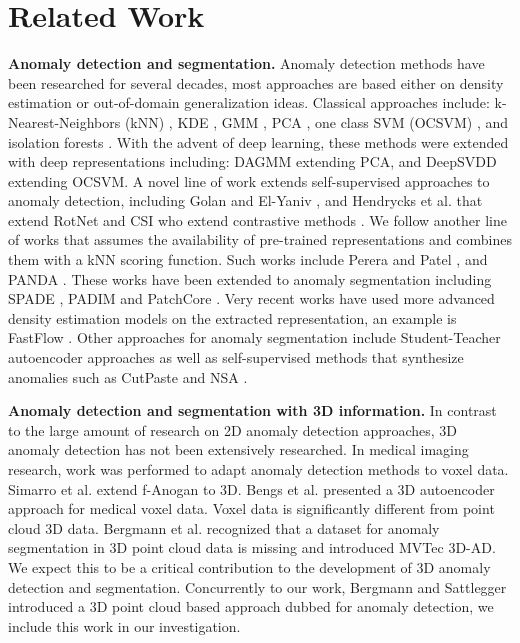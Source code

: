 \documentclass{article}
\begin{document}
\section{Related Work}
\textbf{Anomaly detection and segmentation.} Anomaly detection methods have been researched for several decades, most approaches are based either on density estimation or out-of-domain generalization ideas. Classical approaches include: k-Nearest-Neighbors (kNN) \cite{eskin2002geometric}, KDE \cite{latecki2007outlier}, GMM \cite{glodek2013ensemble}, PCA \cite{jolliffe2011principal}, one class SVM (OCSVM) \cite{scholkopf2000support}, and isolation forests \cite{liu2008isolation}. With the advent of deep learning, these methods were extended with deep representations including: DAGMM \cite{zong2018deep} extending PCA, and DeepSVDD \cite{ruff2018deep} extending OCSVM. A novel line of work extends self-supervised approaches to anomaly detection, including Golan and El-Yaniv \cite{golan2018deep}, and Hendrycks et al. \cite{hendrycks2019using} that extend RotNet \cite{gidaris2018unsupervised} and CSI \cite{tack2020csi} who extend contrastive methods \cite{he2019moco,he2020momentum,chen2020simple}.  We follow another line of works that assumes the availability of pre-trained representations and combines them with a kNN scoring function. Such works include Perera and Patel \cite{perera2019learning}, and PANDA \cite{panda}. These works have been extended to anomaly segmentation including SPADE \cite{spade}, PADIM \cite{defard2021padim} and PatchCore \cite{patchcore}. Very recent works have used more advanced density estimation models on the extracted representation, an example is FastFlow \cite{yu2021fastflow}. Other approaches for anomaly segmentation include Student-Teacher autoencoder approaches \cite{bergmann2020uninformed} as well as self-supervised methods that synthesize anomalies such as CutPaste \cite{cutpaste} and NSA \cite{nsa}. 

\textbf{Anomaly detection and segmentation with 3D information.} In contrast to the large amount of research on 2D anomaly detection approaches, 3D anomaly detection has not been extensively researched. In medical imaging research, work was performed to adapt anomaly detection methods to voxel data. Simarro et al. \cite{simarro2020unsupervised} extend f-Anogan \cite{schlegl2017unsupervised,schlegl2019f} to 3D. Bengs et al. \cite{bengs2021three} presented a 3D autoencoder approach for medical voxel data. Voxel data is significantly different from point cloud 3D data. Bergmann et al. \cite{mvtec3d} recognized that a dataset for anomaly segmentation in 3D point cloud data is missing and introduced MVTec 3D-AD\cite{mvtec3d}. We expect this to be a critical contribution to the development of 3D anomaly detection and segmentation. Concurrently to our work, Bergmann and Sattlegger \cite{bergmann2022anomaly} introduced a 3D point cloud based approach dubbed  for anomaly detection, we include this work in our investigation.
\end{document}
